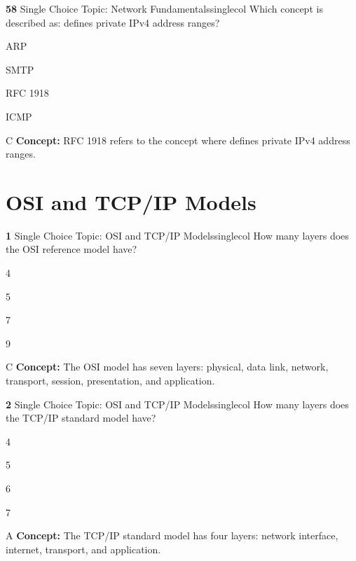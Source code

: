 \documentclass[10pt,a4paper]{article}
\begin{document}
\begin{qcard}{\color{white}\textbf{58} \hfill \small Single Choice \textbar{} Topic: Network Fundamentals}{singlecol}
Which concept is described as: defines private IPv4 address ranges?

\begin{qoptions}
\item ARP
\item SMTP
\item RFC 1918
\item ICMP
\end{qoptions}
\begin{explainbox}{C}
\textbf{Concept:} RFC 1918 refers to the concept where defines private IPv4 address ranges.
\end{explainbox}
\end{qcard}

\section{OSI and TCP/IP Models}
\begin{qcard}{\color{white}\textbf{1} \hfill \small Single Choice \textbar{} Topic: OSI and TCP/IP Models}{singlecol}
How many layers does the OSI reference model have?

\begin{qoptions}
\item 4
\item 5
\item 7
\item 9
\end{qoptions}
\begin{explainbox}{C}
\textbf{Concept:} The OSI model has seven layers: physical, data link, network, transport, session, presentation, and application.
\end{explainbox}
\end{qcard}

\begin{qcard}{\color{white}\textbf{2} \hfill \small Single Choice \textbar{} Topic: OSI and TCP/IP Models}{singlecol}
How many layers does the TCP/IP standard model have?

\begin{qoptions}
\item 4
\item 5
\item 6
\item 7
\end{qoptions}
\begin{explainbox}{A}
\textbf{Concept:} The TCP/IP standard model has four layers: network interface, internet, transport, and application.
\end{explainbox}
\end{qcard}
\end{document}

